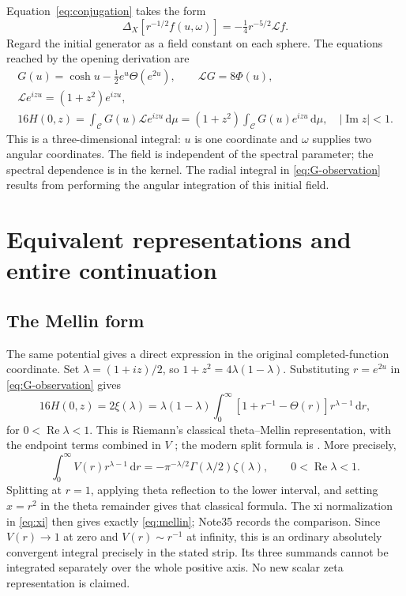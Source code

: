 \documentclass[11pt]{article}
\theoremstyle{remark}
\numberwithin{equation}{section}
\newcommand{\cC}{\mathcal C}
\newcommand{\cL}{\mathcal L}
\newcommand{\dd}{\,\mathrm d}
\begin{document}
Equation~\eqref{eq:conjugation} takes the form
\begin{equation}\label{eq:cylinderconjugation}
 \Delta_X[r^{-1/2}f(u,\omega)]
 =-\tfrac14r^{-5/2}\cL f.
\end{equation}
Regard the initial generator as a field constant on each sphere. The
equations reached by the opening derivation are
\begin{equation}\label{eq:master}
 \boxed{\begin{gathered}
 G(u)=\cosh u-\tfrac12e^u\Theta(e^{2u}),\qquad \cL G=8\Phi(u),\\
 \cL e^{izu}=(1+z^2)e^{izu},\\
 16H(0,z)=\int_{\cC}G(u)\cL e^{izu}\dd\mu
         =(1+z^2)\int_{\cC}G(u)e^{izu}\dd\mu,
 \quad |\operatorname{Im}z|<1.
 \end{gathered}}
\end{equation}
This is a three-dimensional integral: \(u\) is one coordinate and
\(\omega\) supplies two angular coordinates. The field is independent
of the spectral parameter; the spectral dependence is in the kernel.
The radial integral in \eqref{eq:G-observation} results from performing
the angular integration of this initial field.

\section{Equivalent representations and entire continuation}
\label{sec:continuation}

\subsection{The Mellin form}

The same potential gives a direct expression in the original
completed-function coordinate. Set \(\lambda=(1+iz)/2\), so
\(1+z^2=4\lambda(1-\lambda)\). Substituting \(r=e^{2u}\) in
\eqref{eq:G-observation} gives
\begin{equation}\label{eq:mellin}
 \boxed{\displaystyle
 16H(0,z)=2\xi(\lambda)
 =\lambda(1-\lambda)\int_0^\infty
 [1+r^{-1}-\Theta(r)]r^{\lambda-1}\dd r,}
\end{equation}
for \(0<\operatorname{Re}\lambda<1\). This is Riemann's classical
theta--Mellin representation, with the endpoint terms combined in
\(V\) \cite[printed p.~3]{Riemann1859}; the modern split formula is
\cite[Eqs.~25.5.13--14]{DLMF}. More precisely,
\begin{equation}\label{eq:classical-mellin}
 \int_0^\infty V(r)r^{\lambda-1}\dd r
 =-\pi^{-\lambda/2}\Gamma(\lambda/2)\zeta(\lambda),
 \qquad 0<\operatorname{Re}\lambda<1.
\end{equation}
Splitting at \(r=1\), applying theta reflection to the lower interval,
and setting \(x=r^2\) in the theta remainder gives that classical
formula. The xi normalization in \eqref{eq:xi} then gives exactly
\eqref{eq:mellin}; Note35 \cite{Archive} records the comparison.
Since \(V(r)\to1\) at zero and \(V(r)\sim r^{-1}\) at infinity,
this is an ordinary absolutely convergent integral precisely in the
stated strip. Its three summands cannot be integrated separately over
the whole positive axis. No new scalar zeta representation is claimed.
\end{document}
